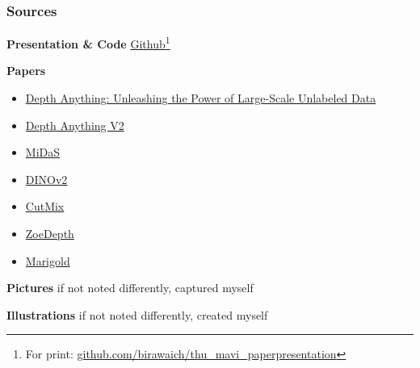 \documentclass[12pt]{beamer}
\begin{document}
\begin{frame}
    \frametitle{Sources}
    \scriptsize
    
    \textbf{Presentation \& Code} \href{https://github.com/birawaich/thu_mavi_paperpresentation}{Github}\footnote{ \tiny For print: \url{github.com/birawaich/thu_mavi_paperpresentation}}
    
    \textbf{Papers}
    \begin{itemize}
        \item \href{https://arxiv.org/abs/2401.10891}{Depth Anything: Unleashing the Power of Large-Scale Unlabeled Data}
        \item \href{https://arxiv.org/abs/2406.09414}{Depth Anything V2}
        \item \href{https://arxiv.org/abs/1907.01341}{MiDaS}
        \item \href{https://arxiv.org/abs/2304.07193}{DINOv2}
        \item \href{https://arxiv.org/abs/1905.04899}{CutMix}
        \item \href{https://arxiv.org/abs/2302.12288}{ZoeDepth}
        \item \href{https://arxiv.org/abs/2312.02145}{Marigold}
    \end{itemize}
    
    \textbf{Pictures}
    if not noted differently, captured myself
    
    \textbf{Illustrations}
    if not noted differently, created myself
    
    
\end{frame}
\end{document}
